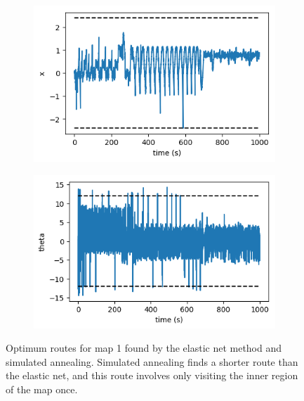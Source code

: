 \documentclass{article}
\begin{document}
\begin{figure}[h]
	\centering
	\begin{subfigure}[t]{0.28\linewidth}
		\centering
		\includegraphics[width = 1.0\linewidth, trim={0 0 0 0}, clip=true]{figures/learn50000_xs.png}
		\label{fig:comp1el}	
	\end{subfigure}%
	\hspace{0.1\linewidth}
	\begin{subfigure}[t]{0.28\linewidth}
		\centering
		\includegraphics[width = 1.0\linewidth, trim={0 0 0 0}, clip=true]{figures/learn50000_thetas.png}
		\label{fig:comp1an}	
	\end{subfigure}%
\caption{Optimum routes for map 1 found by the elastic net method and simulated annealing. Simulated annealing finds a shorter route than the elastic net, and this route involves only visiting the inner region of the map once. }
\label{fig:comp1}
\end{figure}
\end{document}
